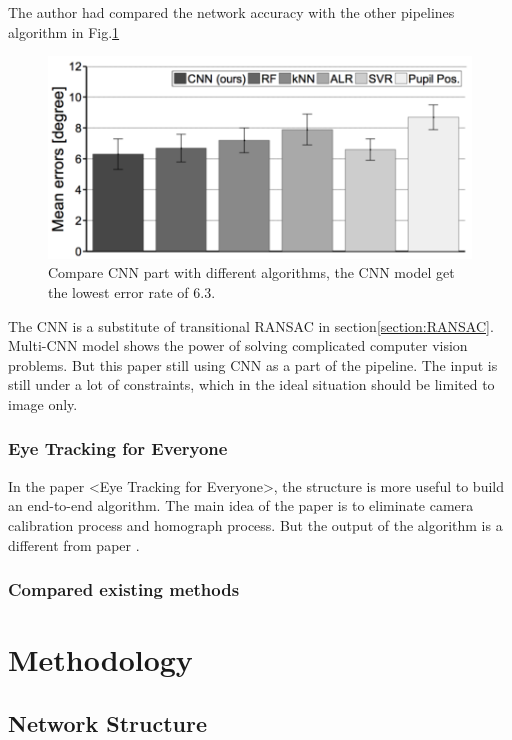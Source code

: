 \documentclass[senior]{IPSstyle}
\begin{document}
The author had compared the network accuracy with the other pipelines algorithm in Fig.\ref{fig:compare}
\begin{figure}
    \centering
    \includegraphics[scale=1.4]{MasterThesis-master/images/csm_MPIIGaze_within_MPII_dataset.png}
    \caption{Compare CNN part with different algorithms, the CNN model get the lowest error rate of 6.3.}
    \label{fig:compare}
\end{figure}
The CNN is a substitute of transitional RANSAC in section\ref{section:RANSAC}.
Multi-CNN model shows the power of solving complicated computer vision problems.
But this paper still using CNN as a part of the pipeline.
The input is still under a lot of constraints, which in the ideal situation should be limited to image only.

\subsection{Eye Tracking for Everyone}
In the paper <Eye Tracking for Everyone>\cite{krafka2016eye}, the structure is more useful to build an end-to-end algorithm.
The main idea of the paper is to eliminate camera calibration process and homograph process.
But the output of the algorithm is a different from paper \cite{zhang2015appearance}.


\subsection{Compared existing methods}

\chapter{Methodology} \label{methodology}
\section{Network Structure} \label{network structure}
\end{document}
